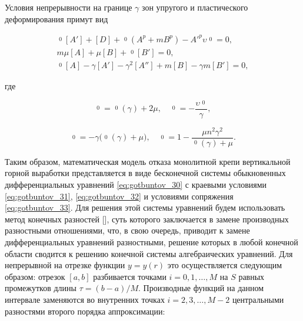 Условия непрерывности на границе $\gamma$ зон упругого и пластического деформирования примут вид

\begin{equation} 

\label{eq:gotbuntov_33} 

\begin{array}{c} 

\mathop{\phi_8}\limits^{0}[A']+[D]+\mathop{\phi_9}\limits^{0}(A^p+mB^p)-A'^p\upsilon  \mathop{\psi_1}\limits^{0}=0,

\\

m\mu[A]+\mu[B]+\mathop{\phi_{10}}\limits^{0}[B']=0,

\\ 

\mathop{\phi_{11}}\limits^{0}[A]-\gamma[A']-\gamma^2[A'']+m[B]-\gamma m[B']=0,

\end{array} 

\end{equation} 

где

$$

\mathop{\phi_8}\limits^{0}=\mathop{\sigma_r^e}\limits^{0}(\gamma)+2\mu,\quad 

\mathop{\phi_9}\limits^{0}=-\frac{\upsilon  \mathop{\psi_3}\limits^{0}}{\gamma},$$

$$

\mathop{\phi_{10}}\limits^{0}=-\gamma\bigl(\mathop{\sigma_r^e}\limits^{0}(\gamma)+\mu\bigr),\quad 

\mathop{\phi_{11}}\limits^{0}=1-\frac{\mu n^2\gamma^2}{\mathop{\sigma_r^e}\limits^{0}(\gamma)+\mu}.

$$  



Таким образом, математическая модель отказа монолитной крепи вертикальной горной выработки представляется в виде бесконечной системы обыкновенных дифференциальных уравнений \eqref{eq:gotbuntov_30} с краевыми условиями \eqref{eq:gotbuntov_31}, \eqref{eq:gotbuntov_32} и условиями сопряжения \eqref{eq:gotbuntov_33}. Для решения этой системы уравнений будем использовать метод конечных разностей [], суть которого заключается в замене производных разностными отношениями, что, в свою очередь, приводит к замене дифференциальных уравнений разностными, решение которых в любой конечной области сводится к решению конечной системы алгебраических уравнений. Для непрерывной на отрезке функции $y=y(r)$ это осуществляется следующим образом: отрезок $[a,b]$ разбивается точками $i=0, 1, \dots, M$ на $S$ равных промежутков длины $\tau=({b-a})/{M}$. Производные функций на данном интервале заменяются во внутренних точках $i=2, 3, \dots, M-2$ центральными разностями второго порядка аппроксимации:

